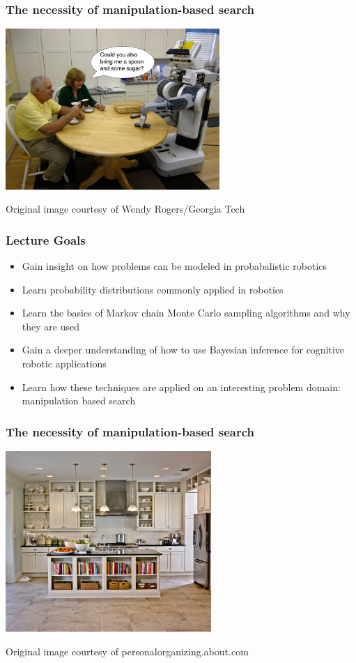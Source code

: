 \begin{frame}
  \frametitle{The necessity of manipulation-based search}
  \begin{center}
    \includegraphics[width=3.2in]{img/robot_in_kitchen.jpg}

    \tiny{Original image courtesy of Wendy Rogers/Georgia Tech}
  \end{center}
\end{frame}

\begin{frame}
  \frametitle{Lecture Goals}
  \begin{itemize}
    \item Gain insight on how problems can be modeled in probabalistic robotics
    \item Learn probability distributions commonly applied in robotics
    \item Learn the basics of Markov chain Monte Carlo sampling algorithms and
      why they are used
    \item Gain a deeper understanding of how to use Bayesian inference for
      cognitive robotic applications
    \item Learn how these techniques are applied on an interesting problem domain:
      manipulation based search
  \end{itemize}
\end{frame}

\begin{frame}
  \frametitle{The necessity of manipulation-based search}
  \begin{center}
    \includegraphics[height=2.7in]{img/kitchen-organization-fake.jpg}

    \tiny{Original image courtesy of personalorganizing.about.com}
  \end{center}
\end{frame}

